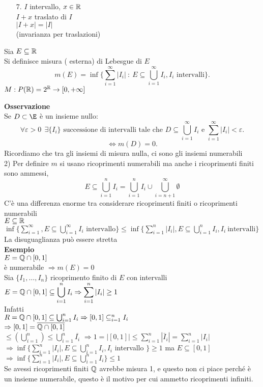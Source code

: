 \documentclass[12px]{article}
\begin{document}
	   \begin{itemize}
	   \item[7.]	$I$ intervallo, $x\in\mathbb{R}$\\
		    $I + x$ traslato di $I$ \\
		    $|I+x| = |I|$\\
		    (invarianza per traslazioni)
	   \end{itemize}
	   \begin{defi}
	Sia $E\subseteq \mathbb{R}$\\
	Si definisce misura ( esterna) di Lebesgue di $E$ 
	\[
		m(E) = \inf\lbrace\sum ^\infty_{i=1} |I_i|\  :\ E\subseteq \bigcup^\infty_{i=1} I_i, I_i \text { intervalli}\rbrace
	.\] 
	$M:P(\mathbb{R}) = 2^{\mathbb{R}} \rightarrow [0,+\infty]$
\end{defi}
\textbf{Osservazione}\\
Se $D\subset \E$ è un insieme nullo:
\[
	\forall \varepsilon >0\ \ \exists \{I_i\} \text{ successione di intervalli tale che }  D\subseteq\bigcup^\infty_{i=1}I_i \text { e } \sum^\infty_{i=1}|I_i| < \varepsilon
.\]
\[
	\Leftrightarrow m(D) = 0
.\] 
Ricordiamo che tra gli insiemi di misura nulla, ci sono gli insiemi numerabili\\
2) Per definire $m$ si usano ricoprimenti numerabili ma anche i ricoprimenti finiti sono ammessi,
\[ E\subseteq \bigcup^n_{i=1}I_i = \bigcup^n_{i=1}I_i\cup\bigcup^\infty_{i = n+1}\emptyset\]
C'è una differenza enorme tra considerare ricoprimenti finiti o ricoprimenti numerabili\\
$E\subseteq \mathbb{R}$\\
$\inf\{ \sum^\infty_{i=1}, E\subseteq\bigcup^\infty_{i=1}I_i \text { intervallo}\}\leq \inf\{ \sum^n_{i=1}|I_i|, E\subseteq\bigcup^n_{i=1}I_i, I_i\ \text{intervalli}\}$\\
La disuguaglianza può essere stretta\\
\textbf{Esempio}\\
$E = \mathbb{Q}\cap[0,1]$\\
è numerabile  $ \Rightarrow m(E) = 0$ \\
Sia $\{I_1,\ldots,I_n\}$ ricoprimento finito di $E$ con intervalli\\
$\displaystyle E  = \mathbb{Q}\cap[0,1]\subseteq \bigcup^n_{i=1}I_i \Rightarrow \sum^n_{i=1}|I_i|\geq 1$ \\
Infatti\\
$R = \mathbb{Q}\cap[0,1]\subseteq\bigcup^n_{i=1}I_i \Rightarrow [0,1]\subseteq^n_{i=1}I_i$ \\
$ \Rightarrow [0,1]=\overline{\mathbb{Q}\cap[0,1]}$ \\
$\displaystyle\leq (\bigcup^n_{i=1})\leq \bigcup^n_{i=1}\overline{I_i}$
$ \Rightarrow 1 = |[0,1]| \leq \sum^n_{i=1} |\overline I_i| = \sum^n_{i=1}|I_i|$ \\
$ \Rightarrow \inf\{ \sum^n_{i=1}|I_i|, E\subseteq \bigcup_{i=1}^n I_i, I_i $ intervallo $\} \geq 1$ ma  $E\subseteq [0,1]$\\
$ \Rightarrow \inf\{\sum^n_{i=1}|I_i|, E\subseteq \bigcup_{i=1}^n I_i\}\leq 1$ \\
Se avessi ricoprimenti finiti $\mathbb{Q}$ avrebbe misura 1, e questo non ci piace perché è un insieme numerabile, questo è il motivo per cui ammetto ricoprimenti infiniti.
\end{document}
